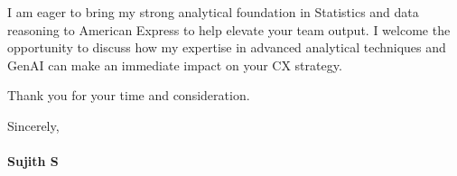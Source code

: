 \documentclass[a4paper,11pt]{article}
\begin{document}
I am eager to bring my strong analytical foundation in Statistics and data reasoning to American Express to help elevate your team output. I welcome the opportunity to discuss how my expertise in advanced analytical techniques and GenAI can make an immediate impact on your CX strategy.

Thank you for your time and consideration.

Sincerely, \\
\vspace{5pt} \\
\textbf{Sujith S}
\end{document}
